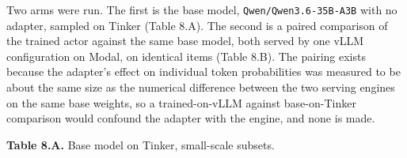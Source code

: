 \documentclass[12pt,a4paper]{report}
\begin{document}
Two arms were run. The first is the base model,
\texttt{Qwen/Qwen3.6-35B-A3B} with no adapter, sampled on Tinker (Table
8.A). The second is a paired comparison of the trained actor against the
same base model, both served by one vLLM configuration on Modal, on
identical items (Table 8.B). The pairing exists because the adapter's
effect on individual token probabilities was measured to be about the
same size as the numerical difference between the two serving engines on
the same base weights, so a trained-on-vLLM against base-on-Tinker
comparison would confound the adapter with the engine, and none is made.

\textbf{Table
8.A.} Base model on Tinker, small-scale subsets.
\end{document}
